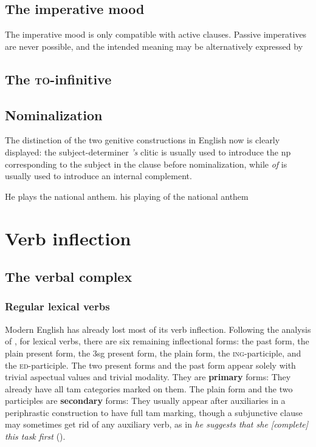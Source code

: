\documentclass[UTF8, a4paper, oneside, scheme=plain, 12pt]{ctexbook}
\newcommand*{\citesec}[1]{\S~{#1}}
\newcommand*{\citechap}[1]{Ch.~{#1}}
\newcommand*{\citechapsec}[2]{\citechap{#1}.\citesec{#2}}
\newcommand*{\concept}[1]{\textbf{#1}}
\newcommand{\form}[1]{\emph{#1}}
\newcommand{\formcat}[1]{\textsc{#1}}
\begin{document}
\section{The imperative mood}

The imperative mood is only compatible with active clauses.
Passive imperatives are never possible, 
and the intended meaning may be alternatively expressed by 

\section{The \formcat{to}-infinitive}

\section{Nominalization}

The distinction of the two genitive constructions in English 
now is clearly displayed:
the subject-determiner \form{'s} clitic 
is usually used to introduce the \ac{np} corresponding to 
the subject in the clause before nominalization,
while \form{of} is usually used to introduce 
an internal complement.

\begin{exe}
    \ex \begin{xlist}
        \ex He plays the national anthem.
        \ex his playing of the national anthem
    \end{xlist}
\end{exe}


\chapter{Verb inflection}\label{chap:verb-inflection}

\section{The verbal complex}\label{sec:verbal-complex}


\subsection{Regular lexical verbs}\label{sec:verb-forms}

Modern English has already lost most of its verb inflection.
Following the analysis of \citet[\citechapsec{3}{1.1}]{cgel},
for lexical verbs,
there are six remaining inflectional forms: 
the past form, the plain present form, 
the 3sg present form,
the plain form, the \formcat{ing}-participle,
and the \formcat{ed}-participle.
The two present forms and the past form appear solely 
with trivial aspectual values and trivial modality.
They are \concept{primary} forms:
They already have all \acs{tam} categories marked on them.
The plain form and the two participles are \concept{secondary} forms:
They usually appear after auxiliaries 
in a periphrastic construction to have full \acs{tam} marking,
though a subjunctive clause may sometimes get rid of any auxiliary verb,
as in \form{he suggests that she [complete] this task first} ().
\end{document}
